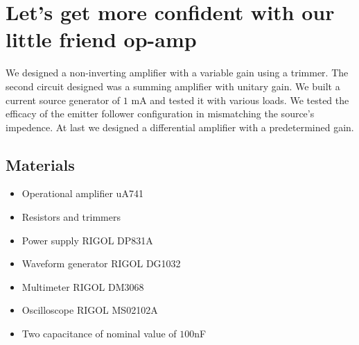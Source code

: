 \chapter{Let's get more confident with our little friend op-amp}
We designed a non-inverting amplifier with a variable gain using a trimmer. The second circuit designed was a summing amplifier with unitary gain. We built a current source generator of $1$ mA and tested it with various loads. We tested the efficacy of the emitter follower configuration in mismatching the source's impedence. At last we designed a differential amplifier with a predetermined gain.
\section{Materials}
\begin{itemize}
\item Operational amplifier uA741
\item Resistors and trimmers
\item Power supply RIGOL DP831A
\item Waveform generator RIGOL DG1032
\item Multimeter RIGOL DM3068
\item Oscilloscope RIGOL MS02102A
\item Two capacitance of nominal value of $100$nF
\end{itemize}
